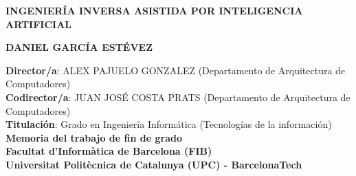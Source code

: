 \thispagestyle{empty}

\begin{figure}[htb]
  \centerline{}
\end{figure}

\begin{center}
  \vspace{2cm}
  {\Large {\bf INGENIERÍA INVERSA ASISTIDA POR INTELIGENCIA ARTIFICIAL}}
 
  \vspace{8cm}
  {\large {\bf DANIEL GARCÍA ESTÉVEZ}}
  
  \vfill
  {\bf Director/a}: ALEX PAJUELO GONZALEZ (Departamento de Arquitectura de Computadores) \\
  {\bf Codirector/a}: JUAN JOSÉ COSTA PRATS (Departamento de Arquitectura de Computadores) \\
  {\bf Titulación}: Grado en Ingeniería Informática (Tecnologías de la información) \\
  \vspace{0.5cm}
  {\bf Memoria del trabajo de fin de grado} \\
  {\bf Facultat d'Informàtica de Barcelona (FIB)} \\
  {\bf Universitat Politècnica de Catalunya (UPC) - BarcelonaTech} \\
\end{center}
